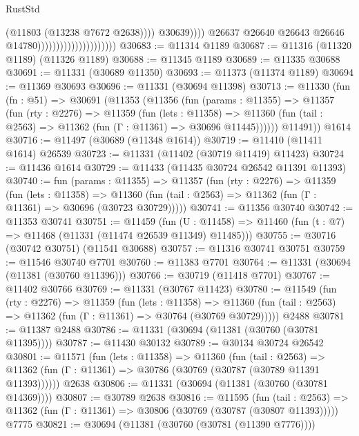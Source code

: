 \begin{lexlean}{RustStd}
\begin{coremodule}
                                                          (@11803 (@13238 @7672 @2638))))
                                                      @30639))))
                                              @26637
                                              @26640
                                              @26643
                                              @26646
                                              @14780)))))))))))))))))))))
@30683 := @11314 @1189
@30687 := @11316 (@11320 @1189) (@11326 @1189)
@30688 := @11345 @1189
@30689 := @11335 @30688
@30691 := @11331 (@30689 @11350)
@30693 := @11373 (@11374 @1189)
@30694 := @11369 @30693
@30696 := @11331 (@30694 @11398)
@30713 := @11330
    (fun (fn : @51) =>
    @30691
      (@11353
        (@11356
          (fun (params : @11355) =>
          @11357
            (fun (rty : @2276) =>
            @11359
              (fun (lets : @11358) =>
              @11360 (fun (tail : @2563) => @11362 (fun (Γ : @11361) => @30696 @11445))))))
        @11491))
    @1614
@30716 := @11497 (@30689 (@11348 @1614))
@30719 := @11410 (@11411 @1614) @26539
@30723 := @11331 (@11402 (@30719 @11419) @11423)
@30724 := @11436 @1614
@30729 := @11433 (@11435 @30724 @26542 @11391 @11393)
@30740 := fun (params : @11355) =>
  @11357
    (fun (rty : @2276) =>
    @11359
      (fun (lets : @11358) =>
      @11360 (fun (tail : @2563) => @11362 (fun (Γ : @11361) => @30696 (@30723 @30729)))))
@30741 := @11356 @30740
@30742 := @11353 @30741
@30751 := @11459
    (fun (U : @11458) => @11460 (fun (t : @7) => @11468 (@11331 (@11474 @26539 @11349) @11485)))
@30755 := @30716 (@30742 @30751) (@11541 @30688)
@30757 := @11316 @30741 @30751
@30759 := @11546 @30740 @7701
@30760 := @11383 @7701
@30764 := @11331 (@30694 (@11381 (@30760 @11396)))
@30766 := @30719 (@11418 @7701)
@30767 := @11402 @30766
@30769 := @11331 (@30767 @11423)
@30780 := @11549
    (fun (rty : @2276) =>
    @11359
      (fun (lets : @11358) =>
      @11360 (fun (tail : @2563) => @11362 (fun (Γ : @11361) => @30764 (@30769 @30729)))))
    @2488
@30781 := @11387 @2488
@30786 := @11331 (@30694 (@11381 (@30760 (@30781 @11395))))
@30787 := @11430 @30132
@30789 := @30134 @30724 @26542
@30801 := @11571
    (fun (lets : @11358) =>
    @11360
      (fun (tail : @2563) =>
      @11362 (fun (Γ : @11361) => @30786 (@30769 (@30787 (@30789 @11391 @11393))))))
    @2638
@30806 := @11331 (@30694 (@11381 (@30760 (@30781 @14369))))
@30807 := @30789 @2638
@30816 := @11595
    (fun (tail : @2563) => @11362 (fun (Γ : @11361) => @30806 (@30769 (@30787 (@30807 @11393)))))
    @7775
@30821 := @30694 (@11381 (@30760 (@30781 (@11390 @7776))))

\end{coremodule}
\end{lexlean}
